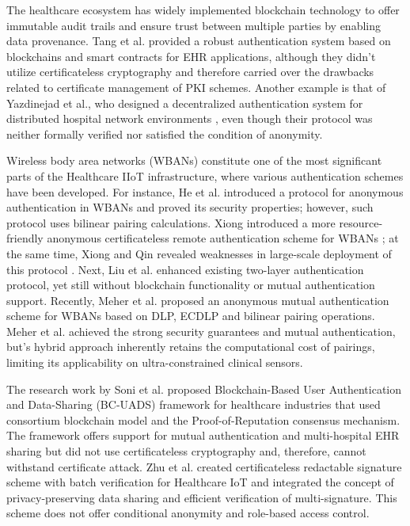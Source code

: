 \documentclass[conference]{IEEEtran}
\begin{document}
The healthcare ecosystem has widely implemented blockchain technology to offer immutable audit trails and ensure trust between multiple parties by enabling data provenance. Tang et al. \cite{ref25} provided a robust authentication system based on blockchains and smart contracts for EHR applications, although they didn't utilize certificateless cryptography and therefore carried over the drawbacks related to certificate management of PKI schemes. Another example is that of Yazdinejad et al., who designed a decentralized authentication system for distributed hospital network environments \cite{ref25}, even though their protocol was neither formally verified nor satisfied the condition of anonymity.

Wireless body area networks (WBANs) constitute one of the most significant parts of the Healthcare IIoT infrastructure, where various authentication schemes have been developed. For instance, He et al. \cite{ref27} introduced a protocol for anonymous authentication in WBANs and proved its security properties; however, such protocol uses bilinear pairing calculations. Xiong introduced a more resource-friendly anonymous certificateless remote authentication scheme for WBANs \cite{ref29}; at the same time, Xiong and Qin revealed weaknesses in large-scale deployment of this protocol . Next, Liu et al. \cite{ref26} enhanced existing two-layer authentication protocol, yet still without blockchain functionality or mutual authentication support. Recently, Meher et al. \cite{ref28} proposed an anonymous mutual authentication scheme for WBANs based on DLP, ECDLP and bilinear pairing operations. Meher et al. achieved the strong security guarantees and mutual authentication, but's hybrid approach inherently retains the computational cost of pairings, limiting its applicability on ultra-constrained clinical sensors.

The research work by Soni et al. \cite{ref26} proposed Blockchain-Based User Authentication and Data-Sharing (BC-UADS) framework for healthcare industries that used consortium blockchain model and the Proof-of-Reputation consensus mechanism. The framework offers support for mutual authentication and multi-hospital EHR sharing but did not use certificateless cryptography and, therefore, cannot withstand certificate attack. Zhu et al. \cite{ref2} created certificateless redactable signature scheme with batch verification for Healthcare IoT and integrated the concept of privacy-preserving data sharing and efficient verification of multi-signature. This scheme does not offer conditional anonymity and role-based access control.
\end{document}
